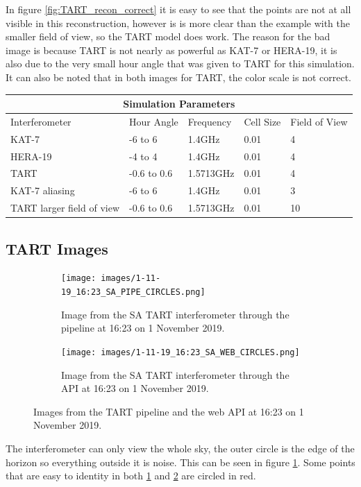 In figure \ref{fig:TART_recon_correct} it is easy to see that the points are not at all visible in this reconstruction, however is is more clear than the example with the smaller field of view, so the TART model does work. The reason for the bad image is because TART is not nearly as powerful as KAT-7 or HERA-19, it is also due to the very small hour angle that was given to TART for this simulation.
It can also be noted that in both images for TART, the color scale is not correct.
\\
\begin{table}[H]
    \centering
    \begin{tabular}{ |p{}||p{}|p{}|p{}| p{}| }
     \hline
     \multicolumn{5}{|c|}{Simulation Parameters} \\
     \hline
     Interferometer & Hour Angle & Frequency & Cell Size & Field of View \\
     \hline
     KAT-7 & -6 to 6 & 1.4GHz & 0.01 & 4 \\
     HERA-19 & -4 to 4 & 1.4GHz & 0.01 & 4 \\
     TART & -0.6 to 0.6 & 1.5713GHz & 0.01 & 4 \\
     KAT-7 aliasing & -6 to 6 & 1.4GHz & 0.01 & 3 \\
     TART larger field of view & -0.6 to 0.6 & 1.5713GHz & 0.01 & 10 \\
     \hline
    \end{tabular}
    
\end{table}

\subsection{TART Images}
\FloatBarrier
\begin{figure}[H]
  \centering
  \begin{subfigure}[b]{0.49\textwidth}
    \centering
    \texttt{[image: images/1-11-19\_16:23\_SA\_PIPE\_CIRCLES.png]}
    \caption{Image from the SA TART interferometer through the pipeline at 16:23 on 1 November 2019.}
    \label{fig:TART_SA}
  \end{subfigure}
  \begin{subfigure}[b]{0.49\textwidth}
    \centering
    \texttt{[image: images/1-11-19\_16:23\_SA\_WEB\_CIRCLES.png]}
    \vspace*{13mm}
    \caption{Image from the SA TART interferometer through the API at 16:23 on 1 November 2019.}
    \label{fig:TART_SA_WEB}
  \end{subfigure}
  \caption{Images from the TART pipeline and the web API at 16:23 on 1 November 2019.}
  \label{fig:TART_RESULTS}
\end{figure}
The interferometer can only view the whole sky, the outer circle is the edge of the horizon so everything outside it is noise. This can be seen in figure \ref{fig:TART_SA}. Some points that are easy to identity in both \ref{fig:TART_SA} and \ref{fig:TART_SA_WEB} are circled in red.

